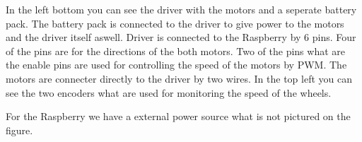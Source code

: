 In the left bottom you can see the driver with the motors and a seperate battery pack.
The battery pack is connected to the driver to give power to the motors and the driver itself aswell.
Driver is connected to the Raspberry by 6 pins.
Four of the pins are for the directions of the both motors.
Two of the pins what are the enable pins are used for controlling the speed of the motors by PWM.
The motors are connecter directly to the driver by two wires.
In the top left you can see the two encoders what are used for monitoring the speed of the wheels.

For the Raspberry we have a external power source what is not pictured on the figure.

